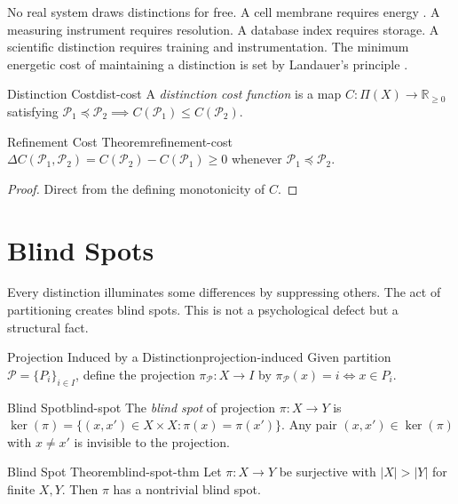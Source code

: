 \documentclass[12pt,twoside,openright]{book}
\newcommand{\partition}{\mathcal{P}}
\begin{document}
No real system draws distinctions for free. A cell
membrane requires energy \parencite{schrodinger1944}.
A measuring instrument requires resolution.
A database index requires storage.
A scientific distinction requires training and
instrumentation. The minimum energetic cost of
maintaining a distinction is set by Landauer's principle
\parencite{landauer1961irreversibility}.

\begin{definition}{Distinction Cost}{dist-cost}
  A \emph{distinction cost function} is a map
  $C: \Pi(X) \to \mathbb{R}_{\ge 0}$ satisfying
  $\partition_1 \preceq \partition_2 \implies
  C(\partition_1) \le C(\partition_2)$.
\end{definition}

\begin{theorem}{Refinement Cost Theorem}{refinement-cost}
  $\Delta C(\partition_1, \partition_2)
  = C(\partition_2) - C(\partition_1) \ge 0$
  whenever $\partition_1 \preceq \partition_2$.
\end{theorem}

\begin{proof}
  Direct from the defining monotonicity of $C$.
\end{proof}

\section{Blind Spots}
\label{sec:ch1-blind}

Every distinction illuminates some differences by
suppressing others. The act of partitioning creates blind
spots. This is not a psychological defect but a
structural fact.

\begin{definition}{Projection Induced by a Distinction}{projection-induced}
  Given partition $\partition = \{P_i\}_{i \in I}$,
  define the projection $\pi_\partition: X \to I$ by
  $\pi_\partition(x) = i \iff x \in P_i$.
\end{definition}

\begin{definition}{Blind Spot}{blind-spot}
  The \emph{blind spot} of projection $\pi: X \to Y$ is
  $\ker(\pi) = \{(x,x') \in X \times X : \pi(x) = \pi(x')\}$.
  Any pair $(x,x') \in \ker(\pi)$ with $x \ne x'$ is
  invisible to the projection.
\end{definition}

\begin{theorem}{Blind Spot Theorem}{blind-spot-thm}
  Let $\pi: X \to Y$ be surjective with $|X| > |Y|$
  for finite $X, Y$. Then $\pi$ has a nontrivial
  blind spot.
\end{theorem}
\end{document}
